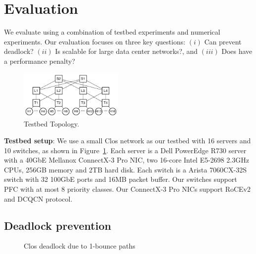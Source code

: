 \section{Evaluation}\label{sec:eval}

We evaluate \sysname{} using a combination of testbed experiments and numerical
experiments. Our evaluation focuses on three key questions: $(i)$ Can \sysname{}
prevent deadlock? $(ii)$ Is \sysname{} scalable for large data center networks?,
and $(iii)$ Does \sysname{} have a performance penalty?

\begin{figure}
	\centering
	\includegraphics[width=0.45\textwidth] {figs/testbed_topo}
	\caption{Testbed Topology.}\label{fig:testbed_topo}
\end{figure}

\textbf{Testbed setup}: We use a small Clos network as our testbed with 16
servers and 10 switches, as shown in Figure~\ref{fig:testbed_topo}. Each server
is a Dell PowerEdge R730 server with a 40GbE Mellanox ConnectX-3 Pro NIC, two
16-core Intel E5-2698 2.3GHz CPUs, 256GB memory and 2TB hard disk. Each switch
is a Arista 7060CX-32S switch with 32 100GbE ports and 16MB packet buffer. Our
switches support PFC with at most 8 priority classes. Our ConnectX-3 Pro NICs
support RoCEv2 and DCQCN protocol.

\subsection{Deadlock prevention}\label{subsec:exp_validation}

\begin{figure}[t]
	\centering
	
	
	\caption{Clos deadlock due to 1-bounce paths}\label{fig:exp_validation_nonloop}
	
\end{figure}

